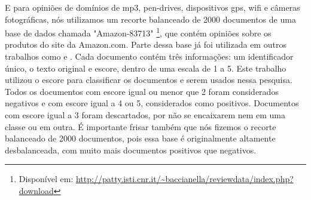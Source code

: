 E para opiniões de domínios de mp3, pen-drives, dispositivos gps, wifi e câmeras fotográficas, nós utilizamos um recorte balanceado de 2000 documentos de uma base de dados chamada  "Amazon-83713" \footnote{Disponível em: \url{http://patty.isti.cnr.it/~baccianella/reviewdata/index.php?download}}, que contém opiniões sobre os produtos do site da Amazon.com. Parte dessa base já foi utilizada em outros trabalhos como \cite{baccianella2010selecting} e \cite{baccianella2014feature}. Cada documento contém três informações: um identificador único, o texto original e escore, dentro de uma escala de 1 a 5. Este trabalho utilizou o escore para classificar os documentos e serem usados nessa pesquisa. Todos os documentos com escore igual ou menor que 2 foram considerados negativos e com escore igual a 4 ou 5, considerados como positivos. Documentos com escore igual a 3 foram descartados, por não se encaixarem nem em uma classe ou em outra. É importante frisar também que nós fizemos o recorte balanceado de 2000 documentos, pois essa base é originalmente altamente desbalanceada, com muito mais documentos positivos que negativos.  



